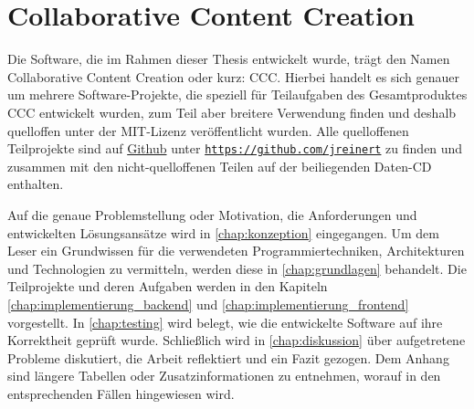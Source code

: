 \section{Collaborative Content Creation}
\label{sec:e_collaborative_content_creation}

Die Software, die im Rahmen dieser Thesis entwickelt wurde, trägt den Namen
Collaborative Content Creation oder kurz: CCC.  Hierbei handelt es sich genauer
um mehrere Software-Projekte, die speziell für Teilaufgaben des Gesamtproduktes
CCC entwickelt wurden, zum Teil aber breitere Verwendung finden und deshalb
quelloffen unter der MIT-Lizenz \cite{mit} veröffentlicht wurden.  Alle
quelloffenen Teilprojekte sind auf \href{https://github.com}{Github} unter
\texttt{\href{https://github.com/jreinert}{https://github.com/jreinert}} zu
finden und zusammen mit den nicht-quelloffenen Teilen auf der beiliegenden
Daten-CD enthalten.

Auf die genaue Problemstellung oder Motivation, die Anforderungen und
entwickelten Lösungsansätze wird in \cref{chap:konzeption} eingegangen.  Um dem
Leser ein Grundwissen für die verwendeten Programmiertechniken, Architekturen
und Technologien zu vermitteln, werden diese in \cref{chap:grundlagen}
behandelt.  Die Teilprojekte und deren Aufgaben werden in den Kapiteln
\ref{chap:implementierung_backend} und \ref{chap:implementierung_frontend}
vorgestellt.  In \cref{chap:testing} wird belegt, wie die entwickelte Software
auf ihre Korrektheit geprüft wurde.  Schließlich wird in \cref{chap:diskussion}
über aufgetretene Probleme diskutiert, die Arbeit reflektiert und ein Fazit
gezogen.  Dem Anhang sind längere Tabellen oder Zusatzinformationen zu
entnehmen, worauf in den entsprechenden Fällen hingewiesen wird.
